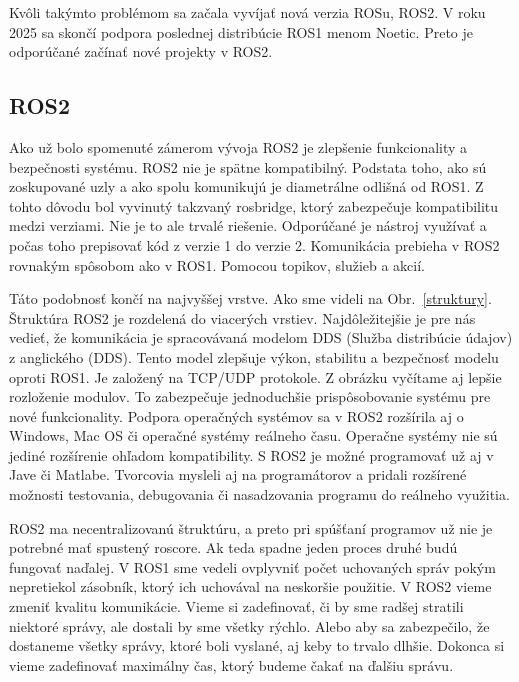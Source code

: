 Kvôli takýmto problémom sa začala vyvíjať nová verzia ROSu, ROS2. V roku 2025 sa skončí podpora poslednej distribúcie ROS1 menom Noetic.
Preto je odporúčané začínať nové projekty v ROS2.

\subsection{ROS2}

Ako už bolo spomenuté zámerom vývoja ROS2 je zlepšenie funkcionality a bezpečnosti systému. ROS2 nie je spätne kompatibilný.
Podstata toho, ako sú zoskupované uzly a ako spolu komunikujú je diametrálne odlišná od ROS1. Z tohto dôvodu bol vyvinutý takzvaný rosbridge,
ktorý zabezpečuje kompatibilitu medzi verziami. Nie je to ale trvalé riešenie. Odporúčané je nástroj využívať a počas toho prepisovať kód
z verzie 1 do verzie 2. Komunikácia prebieha \newline v ROS2 rovnakým spôsobom ako v ROS1. Pomocou topikov, služieb a akcií.

Táto podobnosť končí na najvyššej vrstve. Ako sme videli na Obr.~\ref{struktury}. Štruktúra ROS2 je rozdelená do viacerých vrstiev.
Najdôležitejšie je pre nás vedieť, že komunikácia je spracovávaná modelom DDS (Služba distribúcie údajov) z anglického (\acrlong{DDS}). Tento model zlepšuje výkon, stabilitu
a bezpečnosť modelu oproti ROS1. Je založený na TCP/UDP protokole. Z obrázku vyčítame aj lepšie rozloženie modulov. To zabezpečuje jednoduchšie
prispôsobovanie systému pre nové funkcionality. Podpora operačných systémov sa v ROS2 rozšírila aj o Windows, Mac OS či operačné systémy reálneho času.
Operačne systémy nie sú jediné rozšírenie ohľadom kompatibility. S ROS2 je možné programovať už aj v Jave či Matlabe.
Tvorcovia mysleli aj na programátorov a pridali rozšírené možnosti testovania, debugovania či nasadzovania programu do reálneho využitia.

ROS2 ma necentralizovanú štruktúru, a preto pri spúšťaní programov už nie je potrebné mať spustený roscore. Ak teda spadne
jeden proces druhé budú fungovať naďalej. V ROS1 sme vedeli ovplyvniť počet uchovaných správ pokým nepretiekol zásobník, ktorý ich uchovával na neskoršie použitie.
V ROS2 vieme zmeniť kvalitu komunikácie. Vieme si zadefinovať, či by sme radšej stratili niektoré správy, ale dostali by sme všetky rýchlo. Alebo aby sa zabezpečilo,
že dostaneme všetky správy, ktoré boli vyslané, aj keby to trvalo dlhšie. Dokonca si vieme zadefinovať maximálny čas, ktorý budeme čakať na ďalšiu správu.


